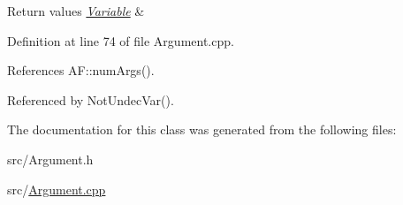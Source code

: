 \begin{DoxyRetVals}{Return values}
{\em \hyperlink{classVariable}{Variable}} & \\
\hline
\end{DoxyRetVals}


Definition at line 74 of file Argument.\-cpp.



References A\-F\-::num\-Args().



Referenced by Not\-Undec\-Var().



The documentation for this class was generated from the following files\-:\begin{DoxyCompactItemize}
\item 
src/Argument.\-h\item 
src/\hyperlink{Argument_8cpp}{Argument.\-cpp}\end{DoxyCompactItemize}
